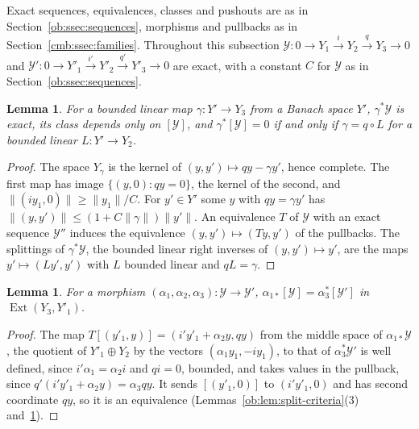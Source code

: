 \documentclass[11pt]{amsart}
\newtheorem{lemma}[theorem]{Lemma}
\theoremstyle{definition}
\theoremstyle{remark}
\numberwithin{equation}{section}
\newcommand{\norm}[1]{\lVert #1\rVert}
\theoremstyle{plain}
\theoremstyle{definition}
\theoremstyle{plain}
\newcommand{\Ext}{\operatorname{Ext}}
\begin{document}
Exact sequences, equivalences, classes and pushouts are as in Section~\ref{ob:ssec:sequences}, morphisms and pullbacks
as in Section~\ref{cmb:ssec:families}. Throughout this subsection $\mathcal Y\colon0\to Y_1\xrightarrow iY_2\xrightarrow
qY_3\to0$ and $\mathcal Y'\colon0\to Y'_1\xrightarrow{i'}Y'_2\xrightarrow{q'}Y'_3\to0$ are exact, with a constant $C$
for $\mathcal Y$ as in Section~\ref{ob:ssec:sequences}.

\begin{lemma}\label{ocl:lem:pullback}
For a bounded linear map $\gamma\colon Y'\to Y_3$ from a Banach space $Y'$, $\gamma^*\mathcal Y$ is exact, its class
depends only on $[\mathcal Y]$, and $\gamma^*[\mathcal Y]=0$ if and only if $\gamma=q\circ L$ for a bounded linear
$L\colon Y'\to Y_2$.
\end{lemma}

\begin{proof}
The space $Y_\gamma$ is the kernel of $(y,y')\mapsto qy-\gamma y'$, hence complete. The first map has image
$\{(y,0):qy=0\}$, the kernel of the second, and $\norm{(iy_1,0)}\ge\norm{y_1}/C$. For $y'\in Y'$ some $y$ with
$qy=\gamma y'$ has $\norm{(y,y')}\le(1+C\norm\gamma)\norm{y'}$. An equivalence $T$ of $\mathcal Y$ with an exact
sequence $\mathcal Y''$ induces the equivalence $(y,y')\mapsto(Ty,y')$ of the pullbacks. The splittings of
$\gamma^*\mathcal Y$, the bounded linear right inverses of $(y,y')\mapsto y'$, are the maps $y'\mapsto(Ly',y')$ with $L$
bounded linear and $qL=\gamma$.
\end{proof}

\begin{lemma}\label{ocl:lem:morphism}
For a morphism $(\alpha_1,\alpha_2,\alpha_3)\colon\mathcal Y\to\mathcal Y'$, $\alpha_{1*}[\mathcal
Y]=\alpha_3^*[\mathcal Y']$ in $\Ext(Y_3,Y'_1)$.
\end{lemma}

\begin{proof}
The map $T[(y'_1,y)]=(i'y'_1+\alpha_2y,qy)$ from the middle space of $\alpha_{1*}\mathcal Y$, the quotient of
$Y'_1\oplus Y_2$ by the vectors $(\alpha_1y_1,-iy_1)$, to that of $\alpha_3^*\mathcal Y'$ is well defined, since
$i'\alpha_1=\alpha_2i$ and $qi=0$, bounded, and takes values in the pullback, since $q'(i'y'_1+\alpha_2y)=\alpha_3qy$. It
sends $[(y'_1,0)]$ to $(i'y'_1,0)$ and has second coordinate $qy$, so it is an equivalence
(Lemmas~\ref{ob:lem:split-criteria}(3) and~\ref{ocl:lem:pullback}).
\end{proof}
\end{document}
